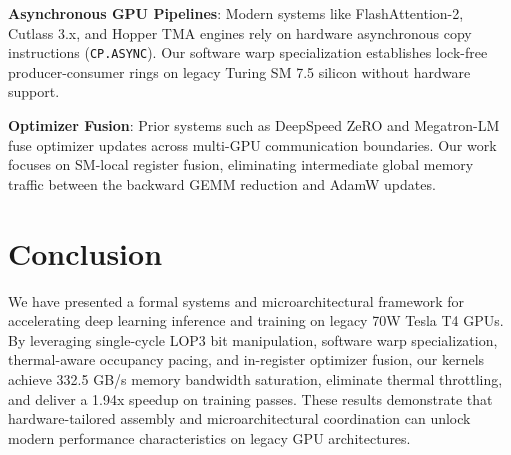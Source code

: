 \documentclass[10pt,twocolumn,letterpaper]{article}
\begin{document}
\textbf{Asynchronous GPU Pipelines}: Modern systems like FlashAttention-2, Cutlass 3.x, and Hopper TMA engines rely on hardware asynchronous copy instructions (\texttt{CP.ASYNC}). Our software warp specialization establishes lock-free producer-consumer rings on legacy Turing SM 7.5 silicon without hardware support.

\textbf{Optimizer Fusion}: Prior systems such as DeepSpeed ZeRO and Megatron-LM fuse optimizer updates across multi-GPU communication boundaries. Our work focuses on SM-local register fusion, eliminating intermediate global memory traffic between the backward GEMM reduction and AdamW updates.

\section{Conclusion}
We have presented a formal systems and microarchitectural framework for accelerating deep learning inference and training on legacy 70W Tesla T4 GPUs. By leveraging single-cycle LOP3 bit manipulation, software warp specialization, thermal-aware occupancy pacing, and in-register optimizer fusion, our kernels achieve 332.5 GB/s memory bandwidth saturation, eliminate thermal throttling, and deliver a 1.94x speedup on training passes. These results demonstrate that hardware-tailored assembly and microarchitectural coordination can unlock modern performance characteristics on legacy GPU architectures.
\end{document}
